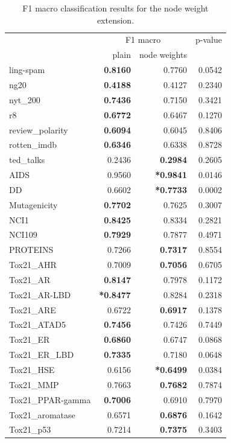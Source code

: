 \begin{table}[htb!]
	\centering
\begin{tabular}{lrrr}
\toprule
	{} & \multicolumn{2}{c}{F1 macro} & {p-value} \\
	{} &  plain &  node weights &  \\
	\midrule
	ling-spam       & \textbf{0.8160} & 0.7760 & 0.0542 \\
	ng20            & \textbf{0.4188} & 0.4127 & 0.2340 \\
	nyt\_200         &\textbf{ 0.7436} & 0.7150 & 0.3421 \\
	r8              & \textbf{0.6772} & 0.6467 & 0.1270 \\
	review\_polarity & \textbf{0.6094} & 0.6045 & 0.8406 \\
	rotten\_imdb     & \textbf{0.6346} & 0.6338 & 0.8728 \\
	ted\_talks       & 0.2436 & \textbf{0.2984} & 0.2605 \\
	\midrule
	AIDS             & 0.9560 & \textbf{*0.9841} & 0.0146 \\
	DD               & 0.6602 & \textbf{*0.7733} & 0.0002 \\
	Mutagenicity     & \textbf{0.7702} & 0.7625 & 0.3007 \\
	NCI1             & \textbf{0.8425} & 0.8334 & 0.2821 \\
	NCI109           & \textbf{0.7929} & 0.7877 & 0.4971 \\
	PROTEINS         & 0.7266 & \textbf{0.7317} & 0.8554 \\
	Tox21\_AHR        & 0.7009 & \textbf{0.7056} & 0.6705 \\
	Tox21\_AR         & \textbf{0.8147} & 0.7978 & 0.1172 \\
	Tox21\_AR-LBD     & \textbf{*0.8477} & 0.8284 & 0.2318 \\
	Tox21\_ARE        & 0.6722 & \textbf{0.6917} & 0.1378 \\
	Tox21\_ATAD5      & \textbf{0.7456} & 0.7426 & 0.7449 \\
	Tox21\_ER         & \textbf{0.6860} & 0.6747 & 0.0868 \\
	Tox21\_ER\_LBD     & \textbf{0.7335} & 0.7180 & 0.0648 \\
	Tox21\_HSE        & 0.6156 & \textbf{*0.6499} & 0.0384 \\
	Tox21\_MMP        & 0.7663 & \textbf{0.7682} & 0.7874 \\
	Tox21\_PPAR-gamma & \textbf{0.7006} & 0.6910 & 0.7970 \\
	Tox21\_aromatase  & 0.6571 & \textbf{0.6876} & 0.1642 \\
	Tox21\_p53        & 0.7214 & \textbf{0.7375} & 0.3403 \\
	\bottomrule
\end{tabular}
\caption[Results: Classification using node weight WL extension]{F1 macro classification results for  the node weight extension.}\label{table:wl_node_weight_extension}
\end{table}

